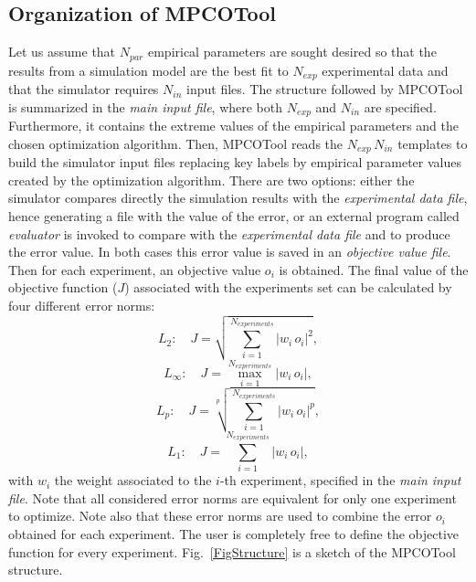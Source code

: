 \documentclass[review,authoryear]{elsarticle}
\newcommand{\EQ}[2]
{\begin{equation}#1\label{#2}\end{equation}}
\newcommand{\PSPICTURE}[7]
{
	\begin{figure}[ht!]
		\centering
		\pspicture(#1,#2)(#3,#4)
			#5
		\endpspicture
		\caption{#6.\label{#7}}
	\end{figure}
}
\newcommand{\ABS}[1]{\left|#1\right|}
\begin{document}
\subsection{Organization of MPCOTool}

Let us assume that $N_{par}$ empirical parameters are sought desired so
that the results from a simulation model are the best fit to $N_{exp}$
experimental data and that the simulator requires $N_{in}$ input files. The
structure followed by MPCOTool is summarized in the \emph{main input file},
where both $N_{exp}$ and $N_{in}$ are specified. Furthermore, it
contains the extreme values of the empirical parameters and the chosen
optimization algorithm. Then, MPCOTool reads the
$N_{exp}\,N_{in}$ templates to build the simulator input files
replacing key labels by empirical parameter values created by the optimization
algorithm. There are two options: either the simulator compares directly the
simulation results with the \emph{experimental data file}, hence generating a
file with the value of the error, or an external program called \emph{evaluator}
is invoked to compare with the \emph{experimental data file} and to produce the
error value. In both cases this error value is saved in an
\emph{objective value file}. Then for each experiment, an objective value $o_i$
is obtained. The final value of the objective function ($J$) associated with the
experiments set can be calculated by four different error norms:
\EQ{L_2:\quad J=\sqrt{\sum_{i=1}^{N_{experiments}}\ABS{w_i\,o_i}^2},}
{EqObjectiveFunctionLII}
\EQ{L_\infty:\quad J=\max_{i=1}^{N_{experiments}}\ABS{w_i\,o_i},}
{EqObjectiveFunctionLi}
\EQ{L_p:\quad J=\sqrt[p]{\sum_{i=1}^{N_{experiments}}\ABS{w_i\,o_i}^p},}
{EqObjectiveFunctionLp}
\EQ{L_1:\quad J=\sum_{i=1}^{N_{experiments}}\ABS{w_i\,o_i},}
{EqObjectiveFunctionLI}
with $w_i$ the weight associated to the $i$-th experiment, specified in the
\emph{main input file}.
Note that all considered error norms are equivalent for only one experiment to
optimize.
Note also that these error norms are used to combine the
error $o_i$ obtained for each experiment. The user is completely free to define
the objective function for every experiment.
Fig.~\ref{FigStructure} is a sketch of the MPCOTool structure.
\end{document}
